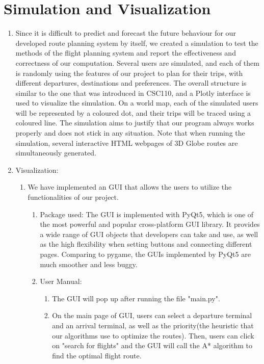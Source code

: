 \documentclass[fontsize=11pt]{article}
\begin{document}
\section*{Simulation and Visualization}

\begin{enumerate}
    \item Since it is difficult to predict and forecast the future behaviour for our developed route planning system by itself, we created a simulation to test the methods of the flight planning system and report the effectiveness and correctness of our computation. Several users are simulated, and each of them is randomly using the features of our project to plan for their trips, with different departures, destinations and preferences. The overall structure is similar to the one that was introduced in CSC110, and a Plotly interface is used to visualize the simulation. On a world map, each of the simulated users will be represented by a coloured dot, and their trips will be traced using a coloured line. The simulation aims to justify that our program always works properly and does not stick in any situation. Note that when running the simulation, several interactive HTML webpages of 3D Globe routes are simultaneously generated.
    \item Visualization: 
    \begin{enumerate}
                \item We have implemented an GUI that allows the users to utilize the functionalities of our project. 
                \begin{enumerate}
                    \item Package used: The GUI is implemented with PyQt5, which is one of the most powerful and popular cross-platform GUI library. It provides a wide range of GUI objects that developers can take and use, as well as the high flexibility when setting buttons and connecting different pages. Comparing to pygame, the GUIs implemented by PyQt5 are much smoother and less buggy.    
                    \item User Manual:
                        \begin{enumerate}
                        \item The GUI will pop up after running the file "main.py". 
                        \item On the main page of GUI, users can select a departure terminal and an arrival terminal, as well as the priority(the heuristic that our algorithms use to optimize the routes). Then, users can click on "search for flights" and the GUI will call the A* algorithm to find the optimal flight route.

\end{enumerate}
\end{enumerate}
\end{enumerate}
\end{enumerate}
\end{document}
